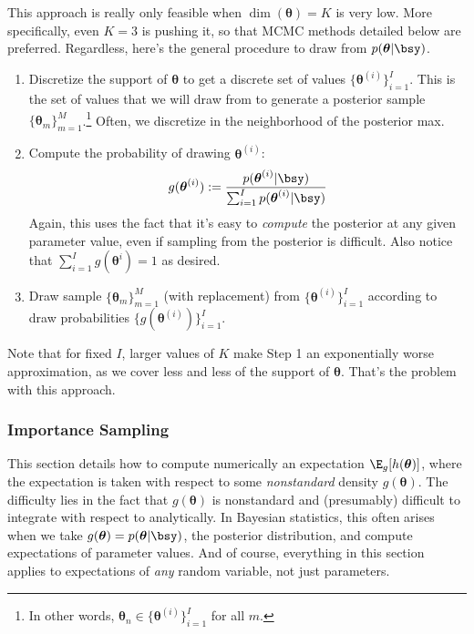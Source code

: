 \documentclass[12pt]{article}
\theoremstyle{plain}
\theoremstyle{definition}
\theoremstyle{remark}
\newcommand{\bstheta}{\boldsymbol{\theta}}
\newcommand{\mM}{_{m=1}^M}
\begin{document}
This approach is really only feasible when $\dim(\bstheta)=K$ is very
low. More specifically, even $K=3$ is pushing it, so that MCMC methods
detailed below are preferred.  Regardless, here's the general procedure
to draw from $p(\bstheta|\bsy)$.
\begin{enumerate}
  \item Discretize the support of $\bstheta$ to get a discrete set of
    values $\{\bstheta^{(i)}\}_{i=1}^I$. This is the set of values that
    we will draw from to generate a posterior sample
    $\{\bstheta_m\}\mM$.\footnote{%
      In other words, $\bstheta_n\in\{\bstheta^{(i)}\}_{i=1}^I$ for all
      $m$.
    }
    Often, we discretize in the neighborhood of the posterior max.
  \item
    Compute the probability of drawing $\bstheta^{(i)}$:
    \begin{align*}
      g(\bstheta^{(i)})
      := \frac{p(\bstheta^{(i)}|\bsy)}{\sum_{i=1}^Ip(\bstheta^{(i)}|\bsy)}
    \end{align*}
    Again, this uses the fact that it's easy to \emph{compute} the
    posterior at any given parameter value, even if sampling from the
    posterior is difficult. Also notice that
    $\sum_{i=1}^I g(\bstheta^i)=1$ as desired.
  \item
    Draw sample $\{\bstheta_m\}\mM$ (with replacement) from
    $\{\bstheta^{(i)}\}_{i=1}^I$ according to draw probabilities
    $\{g(\bstheta^{(i)})\}_{i=1}^I$.
\end{enumerate}
Note that for fixed $I$, larger values of $K$ make Step 1 an
exponentially worse approximation, as we cover less and less of the
support of $\bstheta$. That's the problem with this approach.

\clearpage
\subsubsection{Importance Sampling}

This section details how to compute numerically an expectation
$\E_g[h(\bstheta)]$, where the expectation is taken with respect to some
\emph{nonstandard} density $g(\bstheta)$. The difficulty lies in the fact
that $g(\bstheta)$ is nonstandard and (presumably) difficult to integrate
with respect to analytically. In Bayesian statistics, this often arises
when we take $g(\bstheta)=p(\bstheta|\bsy)$, the posterior distribution,
and compute expectations of parameter values.
And of course, everything in this section applies to expectations of
\emph{any} random variable, not just parameters.
\end{document}
